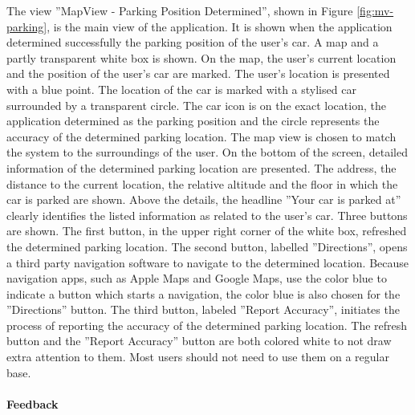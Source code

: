 The view ''MapView - Parking Position Determined'', shown in Figure \ref{fig:mv-parking}, is the main view of the application. It is shown when the application determined successfully the parking position of the user's car. A map and a partly transparent white box is shown. On the map, the user's current location and the position of the user's car are marked. The user's location is presented with a blue point. The location of the car is marked with a stylised car surrounded by a transparent circle. The car icon is on the exact location, the application determined as the parking position and the circle represents the accuracy of the determined parking location. The map view is chosen to match the system to the surroundings of the user. On the bottom of the screen, detailed information of the determined parking location are presented. The address, the distance to the current location, the relative altitude and the floor in which the car is parked are shown. Above the details, the headline ''Your car is parked at'' clearly identifies the listed information as related to the user's car. Three buttons are shown. The first button, in the upper right corner of the white box, refreshed the determined parking location. The second button, labelled ''Directions'', opens a third party navigation software to navigate to the determined location. Because navigation apps, such as Apple Maps and Google Maps, use the color blue to indicate a button which starts a navigation, the color blue is also chosen for the ''Directions'' button. The third button, labeled ''Report Accuracy'', initiates the process of reporting the accuracy of the determined parking location. The refresh button and the ''Report Accuracy'' button are both colored white to not draw extra attention to them. Most users should not need to use them on a regular base. \cite{nielsen1994usability}


\paragraph{Feedback}


